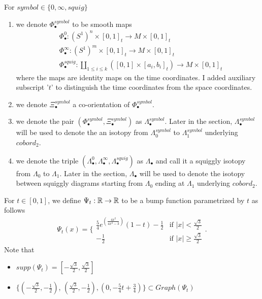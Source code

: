 \begin{definition}
For $symbol\in\{0,\infty, squig \}$
\begin{enumerate}
\item we denote $\Phi_\bullet^{symbol}$ to be smooth maps
\begin{align*}
&\Phi_\bullet^0 : (S^1)^n \times [0,1]_t \rightarrow M \times [0,1]_t \\
&\Phi_\bullet^\infty : (S^1)^m \times [0,1]_t \rightarrow M \times [0,1]_t \\
&\Phi_\bullet^{squig} : \coprod_{1\leq i \leq k} ([0,1] \times [a_i,b_i]_t) \rightarrow M \times [0,1]_t
\end{align*}
where the maps are identity maps on the time coordinates. I added auxiliary subscript '$t$' to distinguish the time coordinates from the space coordinates.

\item we denote $\Xi_\bullet^{symbol}$ a co-orientation of $\Phi_\bullet^{symbol}$.

\item we denote the pair $(\Phi_\bullet^{symbol},\Xi_\bullet^{symbol})$ as $\Lambda_\bullet^{symbol}$. Later in the section, $\Lambda_\bullet^{symbol}$ will be used to denote the an isotopy from $\Lambda_0^{symbol}$ to $\Lambda_1^{symbol}$ underlying $cobord_2$.

\item we denote the triple $(\Lambda_\bullet^{0},\Lambda_\bullet^{\infty},\Lambda_\bullet^{squig})$ as $\Lambda_\bullet$ and call it a squiggly isotopy from $\Lambda_0$ to $\Lambda_1$. Later in the section, $\Lambda_\bullet$ will be used to denote the isotopy between squiggly diagrams starting from $\Lambda_0$ ending at $\Lambda_1$ underlying $cobord_2$.
\end{enumerate}
\end{definition}

\begin{definition}
For $t \in [0,1]$, we define $\Psi_t: \mathbb{R} \rightarrow \mathbb{R}$ to be a bump function parametrized by $t$ as follows
\[\Psi_t(x)=\bigg\{
\begin{array}{ll}
    \frac{5}{4}e^{(\frac{4x^2}{4x^2 - 3})}(1-t) - \frac{1}{2} & \text{if } |x| < \frac{\sqrt{3}}{2} \\
    -\frac{1}{2} & \text{if } |x| \geq \frac{\sqrt{3}}{2} 
\end{array}
\bigg.
\]
Note that 
\begin{itemize}
\item $supp(\Psi_t) = [-\frac{\sqrt{3}}{2},\frac{\sqrt{3}}{2}]$

\item $\{(-\frac{\sqrt{3}}{2},-\frac{1}{2})$, $(\frac{\sqrt{3}}{2},-\frac{1}{2}),(0,-\frac{5}{4}t + \frac{3}{4})\} \subset Graph(\Psi_t)$
\end{itemize}
\end{definition}

